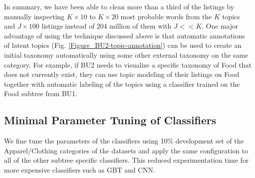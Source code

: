 In summary, we have been able to clean more than a third of the listings by manually inspecting $K\times10$ to $K\times20$ most probable words from the $K$ topics and $J\times100$ listings instead of 204 million of them with $J << K$.
One major advantage of using the technique discussed above is that automatic annotations of latent topics (Fig. \ref{Figure_BU2-topic-annotation}) can be used to create an initial taxonomy automatically using some other external taxonomy on the same category. 
For example, if BU2 needs to visualize a specific taxonomy of Food that does not currently exist, they can use topic modeling of their listings on Food together with automatic labeling of the topics using a classifier trained on the Food subtree from BU1.


\vspace{-0.2cm}
\subsection{Minimal Parameter Tuning of Classifiers}
\label{Subsect:experimental_setup>param_tuning}
\vspace{-0.2cm}

We fine tune the parameters of the classifiers using 10\% development set of the Apparel/Clothing categories of the datasets and apply the same configuration to all of the other subtree specific classifiers.
This reduced experimentation time for more expensive classifiers such as GBT and CNN.

\clearpage
